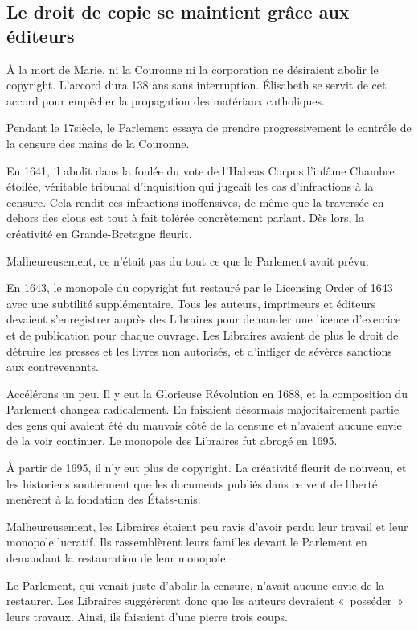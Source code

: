 \subsection{Le droit de copie se maintient grâce aux éditeurs}
À la mort de Marie, ni la Couronne ni la corporation ne désiraient abolir le copyright. L'accord dura 138 ans sans interruption. Élisabeth se servit de cet accord pour empêcher la propagation des
matériaux catholiques.

Pendant le 17\ieme siècle, le Parlement essaya de prendre progressivement le contrôle de la censure des mains de la Couronne. 

En 1641, il abolit dans la foulée du vote de
l'Habeas Corpus l'infâme Chambre étoilée, véritable tribunal d'inquisition qui jugeait les
cas
d'infractions
à la censure. Cela rendit ces infractions inoffensives, de même que la traversée en dehors des clous est tout à fait tolérée concrètement parlant. Dès lors, la créativité en Grande-Bretagne fleurit.

Malheureusement, ce n'était pas du tout ce que le Parlement avait prévu.

En 1643, le monopole du copyright fut restauré par le Licensing Order of 1643 avec une subtilité supplémentaire. Tous
les auteurs, imprimeurs et éditeurs devaient s'enregistrer auprès des Libraires pour demander une licence
d'exercice et de publication pour chaque ouvrage. Les Libraires avaient de plus le droit de détruire les presses et les livres non autorisés, et d'infliger de sévères sanctions aux contrevenants.

Accélérons un peu. Il y eut la Glorieuse Révolution en 1688, et la composition du Parlement changea radicalement. En faisaient désormais majoritairement partie des gens qui avaient été du mauvais côté de la
censure et n'avaient aucune envie de la voir continuer. Le monopole des Libraires fut abrogé en 1695.

À partir de 1695, il n'y eut plus de copyright. La créativité fleurit de nouveau, et les historiens soutiennent que les documents publiés dans ce vent de liberté menèrent à la fondation des
États-unis.

Malheureusement, les Libraires étaient peu ravis d'avoir perdu leur travail et leur monopole lucratif. Ils rassemblèrent leurs familles devant le Parlement en demandant la restauration de leur
monopole.

Le Parlement, qui venait juste d'abolir la censure, n'avait aucune envie de la restaurer. Les Libraires suggérèrent donc que les auteurs devraient «~posséder~» leurs travaux. Ainsi, ils
faisaient d'une pierre trois coups. 

